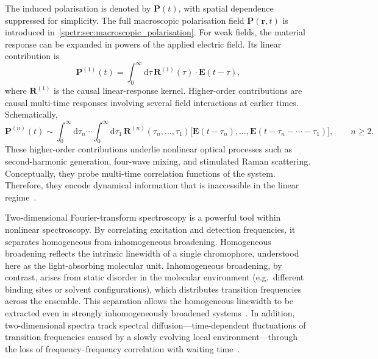 The induced polarisation is denoted by \(\boldsymbol{P}(t)\), with spatial dependence suppressed for simplicity. The full macroscopic polarisation field \(\boldsymbol{P}(\boldsymbol{r},t)\) is introduced in~\autoref{spctr:sec:macroscopic_polarisation}. For weak fields, the material response can be expanded in powers of the applied electric field. Its linear contribution is~\cite{kubo1957statisticalmechanicaltheoryirreversible}
\begin{equation*}
\boldsymbol{P}^{(1)}(t) = \int_{0}^{\infty}\!\mathrm{d}\tau\,
\boldsymbol{R}^{(1)}(\tau)\!\cdot\!\boldsymbol{E}(t-\tau),
\end{equation*}
where \(\boldsymbol{R}^{(1)}\) is the causal linear-response kernel.
Higher-order contributions are causal multi-time responses involving several field interactions at earlier times. Schematically,
\begin{equation*}
	\boldsymbol{P}^{(n)}(t)
	\sim
	\int_{0}^{\infty}\!\mathrm{d}\tau_n\cdots\int_{0}^{\infty}\!\mathrm{d}\tau_1\,
	\boldsymbol{R}^{(n)}(\tau_n,\ldots,\tau_1)
	\bigl[
	\boldsymbol{E}(t-\tau_n),\ldots,
	\boldsymbol{E}(t-\tau_n-\cdots-\tau_1)
	\bigr],
	\qquad n\ge 2.
\end{equation*}
These higher-order contributions underlie nonlinear optical processes such as second-harmonic generation, four-wave mixing, and stimulated Raman scattering.
Conceptually, they probe multi-time correlation functions of the system.
Therefore, they encode dynamical information that is inaccessible in the linear regime~\cite{frankenetal1961generationopticalharmonics, mukamel1995principlesnonlinearoptical}.

Two-dimensional Fourier-transform spectroscopy is a powerful tool within nonlinear spectroscopy.
By correlating excitation and detection frequencies, it separates homogeneous from inhomogeneous broadening.
Homogeneous broadening reflects the intrinsic linewidth of a single chromophore, understood here as the light-absorbing molecular unit.
Inhomogeneous broadening, by contrast, arises from static disorder in the molecular environment (e.g.\ different binding sites or solvent configurations), which distributes transition frequencies across the ensemble.
This separation allows the homogeneous linewidth to be extracted even in strongly inhomogeneously broadened systems~\cite{bangertetal2022highresolutiontwodimensionalelectronic, freschetal2023twodimensionalelectronicspectroscopy}.
In addition, two-dimensional spectra track spectral diffusion---time-dependent fluctuations of transition frequencies caused by a slowly evolving local environment---through the loss of frequency--frequency correlation with waiting time~\cite{cho2009twodimensionalopticalspectroscopy,mukamel1995principlesnonlinearoptical}.

